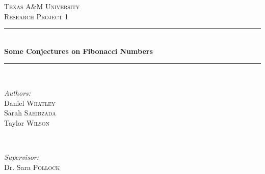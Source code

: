 \documentclass[11pt]{article}
\begin{document}



\begin{titlepage}

\newcommand{\HRule}{\rule{\linewidth}{0.5mm}} 

\center %
 

\textsc{\LARGE Texas A$\&$M University}\\[1.5cm] 
\textsc{\Large Research Project 1}\\[0.5cm] %


\HRule \\[0.4cm]
{ \huge \bfseries Some Conjectures on Fibonacci Numbers }\\[0.4cm]  %
\HRule \\[1.5cm]
 

\begin{minipage}{0.4\textwidth}
\begin{flushleft} \large
\emph{Authors:}\\
Daniel \textsc{Whatley}\\
Sarah \textsc{Sahibzada}\\
Taylor \textsc{Wilson}
\end{flushleft}
\end{minipage}
~
\begin{minipage}{0.4\textwidth}
\begin{flushright} \large
\emph{Supervisor:} \\
Dr. Sara \textsc{Pollock} 
\end{flushright}
\end{minipage}\\[4cm]



\end{titlepage}
\end{document}
